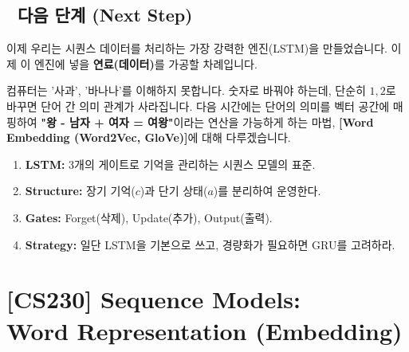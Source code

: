\documentclass[11pt,a4paper]{book}
\theoremstyle{definition}
\begin{document}
\section*{🔗 다음 단계 (Next Step)}
이제 우리는 시퀀스 데이터를 처리하는 가장 강력한 엔진(LSTM)을 만들었습니다. 이제 이 엔진에 넣을 \textbf{연료(데이터)}를 가공할 차례입니다.

컴퓨터는 '사과', '바나나'를 이해하지 못합니다. 숫자로 바꿔야 하는데, 단순히 $1, 2$로 바꾸면 단어 간 의미 관계가 사라집니다.
다음 시간에는 단어의 의미를 벡터 공간에 매핑하여 \textbf{"왕 - 남자 + 여자 = 여왕"}이라는 연산을 가능하게 하는 마법, \textbf{[Word Embedding (Word2Vec, GloVe)]}에 대해 다루겠습니다.

\vspace{0.5cm}

\begin{summarybox}[title={단원 요약 (Cheat Sheet)}]
\begin{enumerate}
    \item \textbf{LSTM:} 3개의 게이트로 기억을 관리하는 시퀀스 모델의 표준.
    \item \textbf{Structure:} 장기 기억($c$)과 단기 상태($a$)를 분리하여 운영한다.
    \item \textbf{Gates:} Forget(삭제), Update(추가), Output(출력).
    \item \textbf{Strategy:} 일단 LSTM을 기본으로 쓰고, 경량화가 필요하면 GRU를 고려하라.
\end{enumerate}
\end{summarybox}


\chapter{[CS230] Sequence Models: \\ Word Representation (Embedding)}
\label{ch:lecture43}

\end{document}
